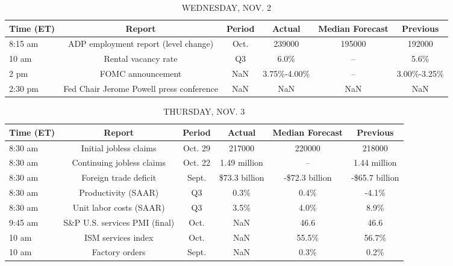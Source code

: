 \documentclass{article}%
\begin{document}
\begin{table}[htbp]%
\caption{WEDNESDAY, NOV. 2}%
\centering%
\begin{adjustbox}{width=1\textwidth}%
\begin{tabular}{lccccc}
\toprule
Time (ET) &                                   Report & Period &      Actual & Median Forecast &    Previous \\
\midrule
  8:15 am &     ADP employment report (level change) &   Oct. &      239000 &          195000 &      192000 \\
    10 am &                      Rental vacancy rate &     Q3 &        6.0\% &              -- &        5.6\% \\
     2 pm &                        FOMC announcement &    NaN & 3.75\%-4.00\% &              -- & 3.00\%-3.25\% \\
  2:30 pm & Fed Chair Jerome Powell press conference &    NaN &         NaN &             NaN &         NaN \\
\bottomrule
\end{tabular}
%
\end{adjustbox}%
\end{table}

%


\begin{table}[htbp]%
\caption{THURSDAY, NOV. 3}%
\centering%
\begin{adjustbox}{width=1\textwidth}%
\begin{tabular}{lccccc}
\toprule
Time (ET) &                        Report &  Period &        Actual & Median Forecast &       Previous \\
\midrule
  8:30 am &        Initial jobless claims & Oct. 29 &        217000 &          220000 &         218000 \\
  8:30 am &     Continuing jobless claims & Oct. 22 &  1.49 million &              -- &   1.44 million \\
  8:30 am &         Foreign trade deficit &   Sept. & \$73.3 billion &  -\$72.3 billion & -\$65.7 billion \\
  8:30 am &           Productivity (SAAR) &      Q3 &          0.3\% &            0.4\% &          -4.1\% \\
  8:30 am &       Unit labor costs (SAAR) &      Q3 &          3.5\% &            4.0\% &           8.9\% \\
  9:45 am & S\&P U.S. services PMI (final) &    Oct. &           NaN &            46.6 &           46.6 \\
    10 am &            ISM services index &    Oct. &           NaN &           55.5\% &          56.7\% \\
    10 am &                Factory orders &   Sept. &           NaN &            0.3\% &           0.2\% \\
\bottomrule
\end{tabular}
%
\end{adjustbox}%
\end{table}
\end{document}
